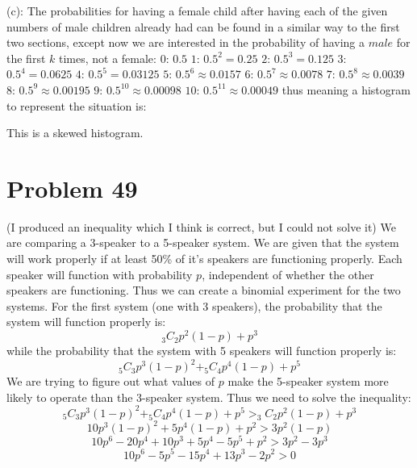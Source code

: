 \documentclass{article}
\theoremstyle{definition}
\newcommand{\?}{\stackrel{?}{=}}
\begin{document}
(c): The probabilities for having a female child after having each of the given numbers of male children already had can be found in a similar way to 
the first two sections, except now we are interested in the probability of having a $male$ for the first $k$ times, not a female:\newline
$0$: $0.5$\newline
$1$: $0.5^2=0.25$\newline
$2$: $0.5^3=0.125$\newline
$3$: $0.5^4=0.0625$\newline
$4$: $0.5^5=0.03125$\newline
$5$: $0.5^6\approx 0.0157$\newline
$6$: $0.5^7\approx 0.0078$\newline
$7$: $0.5^8\approx 0.0039$\newline
$8$: $0.5^9\approx 0.00195$\newline
$9$: $0.5^{10}\approx 0.00098$\newline
$10$: $0.5^{11}\approx 0.00049$\newline
thus meaning a histogram to represent the situation is:\newline
{}
\newline
This is a skewed histogram.

\section*{Problem 49}
(I produced an inequality which I think is correct, but I could not solve it)\newline
We are comparing a 3-speaker to a 5-speaker system. We are given that the system will work properly if at least 50\% of it's speakers are functioning properly. Each speaker will function 
with probability $p$, independent of whether the other speakers are functioning. Thus we can create a binomial experiment for the two systems. For the first system
(one with 3 speakers), the probability that the system will function properly is: \[ _3C_2p^2(1-p)+p^3 \] while the probability that the system with 5 speakers will function properly is:
\[ _5C_3p^3(1-p)^2+_5C_4p^4(1-p)+p^5 \] We are trying to figure out what values of $p$ make the 5-speaker system more likely to operate than the 3-speaker system. Thus we need to solve the 
inequality:
\[ _5C_3p^3(1-p)^2+_5C_4p^4(1-p)+p^5>_3C_2p^2(1-p)+p^3 \]
\[ 10p^3(1-p)^2+5p^4(1-p)+p^2>3p^2(1-p) \]
\[ 10p^6-20p^4+10p^3+5p^4-5p^5+p^2>3p^2-3p^3 \]
\[ 10p^6-5p^5-15p^4+13p^3-2p^2>0 \]
\end{document}
